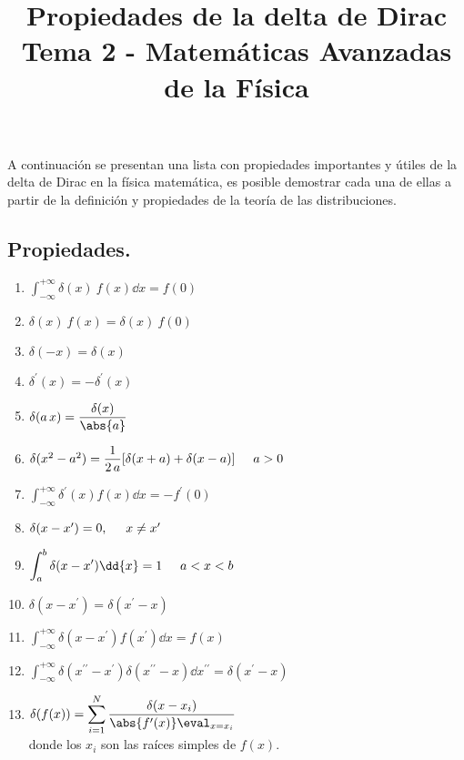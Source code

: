 
\author{}
\title{Propiedades de la delta de Dirac \\ \large {Tema 2 - Matemáticas Avanzadas de la Física}  \vspace{-1.5\baselineskip}}
\date{}

\renewcommand\labelenumii{\theenumi.{\arabic{enumii}}}
\maketitle
\fontsize{14}{14}\selectfont
A continuación se presentan una lista con propiedades importantes y útiles de la delta de Dirac en la física matemática, es posible demostrar cada una de ellas a partir de la definición y propiedades de la teoría de las distribuciones.
\subsection*{Propiedades.}
\begin{multicols}{2}
\begin{enumerate}[itemsep=10pt,parsep=2pt, label=\roman*)]
\item $\displaystyle \int_{-\infty}^{+\infty} \delta (x) \: f(x) \dd{x} = f(0)$
\item $\delta (x) \: f(x) = \delta(x) \: f(0)$
\item $\delta (-x) = \delta(x)$
\item $\delta^{\prime} (x) = - \delta^{\prime}(x)$
\item $\delta (a \, x) =  \dfrac{\delta (x)}{\abs{a}}$
\item $\delta (x^{2} - a^{2}) = \dfrac{1}{2 \, a} [\delta (x + a) +  \delta (x-a)] \hspace{0.5cm} a > 0$
\item $\displaystyle \int_{-\infty}^{+\infty} \delta^{\prime} (x) f(x) \dd{x} = - f^{\prime} (0)$
\item $\delta (x - x^{\prime}) = 0, \hspace{0.5cm} x \neq x^{\prime}$
\item $\displaystyle \int_{a}^{b} \delta (x - x^{\prime}) \dd{x} = 1 \hspace{0.5cm} a < x < b$
\item $\delta (x - x^{\prime}) =  \delta (x^{\prime} - x)$
\item $\displaystyle \int_{-\infty}^{+\infty} \delta (x - x^{\prime}) f(x^{\prime}) \dd{x} = f(x)$
\item $\displaystyle \int_{-\infty}^{+\infty} \delta (x^{\prime \prime} - x^{\prime}) \delta (x^{\prime \prime} - x) \dd{x^{\prime \prime}} = \delta (x^{\prime} - x)$
\item $\displaystyle \delta (f(x)) = \sum_{i=1}^{N} \dfrac{\delta (x - x_{i})}{\abs{f^{\prime}(x)} \eval_{x=x_{i}}}$
\\
\bigskip
donde los $x_{i}$ son las raíces simples de $f(x)$.
\end{enumerate}
\end{multicols}
\newpage
